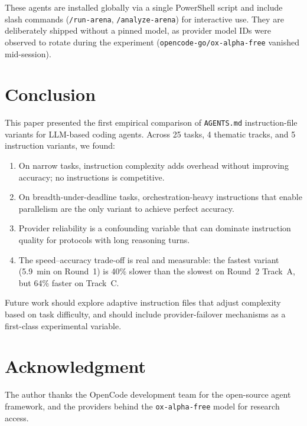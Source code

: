 \documentclass[journal]{IEEEtran}
\begin{document}
These agents are installed globally via a single PowerShell script and
include slash commands (\texttt{/run-arena}, \texttt{/analyze-arena}) for
interactive use.
They are deliberately shipped without a pinned model, as provider model
IDs were observed to rotate during the experiment
(\texttt{opencode-go/ox-alpha-free} vanished mid-session).

\section{Conclusion}
\label{sec:conclusion}

This paper presented the first empirical comparison of \texttt{AGENTS.md}
instruction-file variants for LLM-based coding agents.
Across 25 tasks, 4 thematic tracks, and 5 instruction variants, we found:

\begin{enumerate}
    \item On narrow tasks, instruction complexity adds overhead without
          improving accuracy; no instructions is competitive.
    \item On breadth-under-deadline tasks, orchestration-heavy instructions
          that enable parallelism are the only variant to achieve perfect
          accuracy.
    \item Provider reliability is a confounding variable that can dominate
          instruction quality for protocols with long reasoning turns.
    \item The speed--accuracy trade-off is real and measurable: the fastest
          variant (5.9~min on Round~1) is 40\% slower than the slowest on
          Round~2 Track~A, but 64\% faster on Track~C.
\end{enumerate}

Future work should explore adaptive instruction files that adjust complexity
based on task difficulty, and should include provider-failover mechanisms as
a first-class experimental variable.

\section*{Acknowledgment}

The author thanks the OpenCode development team for the open-source agent
framework, and the providers behind the \texttt{ox-alpha-free} model for
research access.
\end{document}

